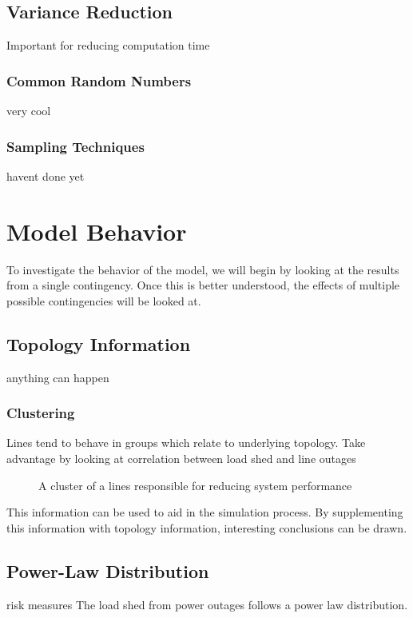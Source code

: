 \subsection{Variance Reduction}
Important for reducing computation time
\subsubsection{Common Random Numbers}
very cool
\subsubsection{Sampling Techniques}
havent done yet


\section{Model Behavior}
To investigate the behavior of the model, we will begin by looking at the results from a single contingency.  Once this is better understood, the effects of multiple possible contingencies will be looked at.
\subsection{Topology Information}
anything can happen
\subsubsection{Clustering}
Lines tend to behave in groups which relate to underlying topology.
Take advantage by looking at correlation between load shed and line outages


\begin{figure}
\begin{center}

\end{center}
\caption{A cluster of a lines responsible for reducing system performance}
\label{fig:cluster}
\end{figure}

This information can be used to aid in the simulation process.  By supplementing this information with topology information, interesting conclusions can be drawn.

\subsection{Power-Law Distribution}
risk measures
The load shed from power outages follows a power law distribution.



